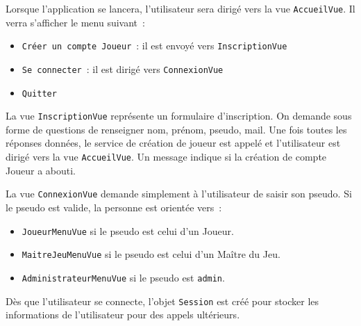 \documentclass[11pt]{article}
\begin{document}
Lorsque l'application se lancera, l'utilisateur sera dirigé vers la vue \texttt{AccueilVue}. Il verra s'afficher le menu suivant~:
\begin{itemize}[label=, font=\small]
    \item \texttt{Créer un compte Joueur}~: il est envoyé vers \texttt{InscriptionVue}
    \item \texttt{Se connecter}~: il est dirigé vers \texttt{ConnexionVue}
    \item \texttt{Quitter}
\end{itemize}

\bigbreak

La vue \texttt{InscriptionVue} représente un formulaire d'inscription. On demande sous forme de questions de renseigner nom, prénom, pseudo, mail. Une fois toutes les réponses données, le service de création de joueur est appelé et l'utilisateur est dirigé vers la vue \texttt{AccueilVue}. Un message indique si la création de compte Joueur a abouti. 

La vue \texttt{ConnexionVue} demande simplement à l'utilisateur de saisir son pseudo. Si le pseudo est valide, la personne est orientée vers~:
\begin{itemize}[label=, font=\small]
    \item \texttt{JoueurMenuVue} si le pseudo est celui d'un Joueur.
    \item \texttt{MaitreJeuMenuVue} si le pseudo est celui d'un Maître du Jeu.
    \item \texttt{AdministrateurMenuVue} si le pseudo est \texttt{admin}.
\end{itemize}

Dès que l'utilisateur se connecte, l'objet \texttt{Session} est créé pour stocker les informations de l'utilisateur pour des appels ultérieurs.
\bigbreak
\end{document}
